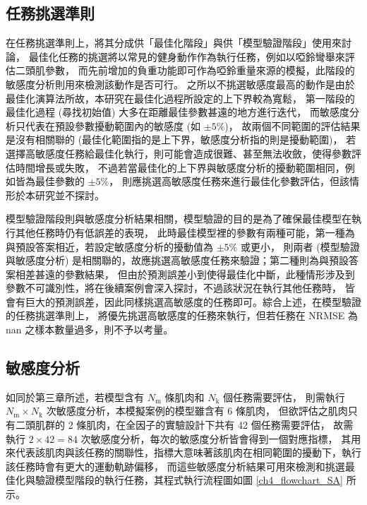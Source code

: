 \subsection{任務挑選準則}
在任務挑選準則上，將其分成供「最佳化階段」與供「模型驗證階段」使用來討論，
最佳化任務的挑選將以常見的健身動作作為執行任務，例如以啞鈴彎舉來評估二頭肌參數，
而先前增加的負重功能即可作為啞鈴重量來源的模擬，此階段的敏感度分析則用來檢測該動作是否可行。
之所以不挑選敏感度最高的動作是由於最佳化演算法所故，本研究在最佳化過程所設定的上下界較為寬鬆，
第一階段的最佳化過程 (尋找初始值) 大多在距離最佳參數甚遠的地方進行迭代，
而敏感度分析只代表在預設參數擾動範圍內的敏感度 (如 $\pm 5\%$)，
故兩個不同範圍的評估結果是沒有相關聯的 (最佳化範圍指的是上下界，敏感度分析指的則是擾動範圍)，
若選擇高敏感度任務給最佳化執行，則可能會造成很難、甚至無法收斂，使得參數評估時間增長或失敗，
不過若當最佳化的上下界與敏感度分析的擾動範圍相同，例如皆為最佳參數的 $\pm 5\%$，
則應挑選高敏感度任務來進行最佳化參數評估，但該情形於本研究並不探討。

模型驗證階段則與敏感度分析結果相關，模型驗證的目的是為了確保最佳模型在執行其他任務時仍有低誤差的表現，
此時最佳模型裡的參數有兩種可能，第一種為與預設答案相近，若設定敏感度分析的擾動值為 $\pm 5\%$ 或更小，
則兩者 (模型驗證與敏感度分析) 是相關聯的，故應挑選高敏感度任務來驗證；第二種則為與預設答案相差甚遠的參數結果，
但由於預測誤差小到使得最佳化中斷，此種情形涉及到參數不可識別性，將在後續案例會深入探討，不過該狀況在執行其他任務時，
皆會有巨大的預測誤差，因此同樣挑選高敏感度的任務即可。綜合上述，在模型驗證的任務挑選準則上，
將優先挑選高敏感度的任務來執行，但若任務在 NRMSE 為 nan 之樣本數量過多，則不予以考量。

\clearpage

\subsection{敏感度分析}
如同於第三章所述，若模型含有 $N_\mathrm{m}$ 條肌肉和 $N_\mathrm{k}$ 個任務需要評估，
則需執行 $N_\mathrm{m} \times N_\mathrm{k}$ 次敏感度分析，本模擬案例的模型雖含有 6 條肌肉，
但欲評估之肌肉只有二頭肌群的 2 條肌肉，在全因子的實驗設計下共有 42 個任務需要評估，
故需執行 $2 \times 42 = 84$ 次敏感度分析，每次的敏感度分析皆會得到一個對應指標，
其用來代表該肌肉與該任務的關聯性，指標大意味著該肌肉在相同範圍的擾動下，執行該任務時會有更大的運動軌跡偏移，
而這些敏感度分析結果可用來檢測和挑選最佳化與驗證模型階段的執行任務，其程式執行流程圖如圖 \ref{ch4_flowchart_SA} 所示。

